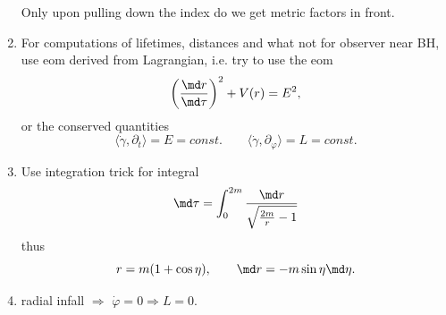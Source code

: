 \begin{enumerate}
\begin{equation}
\end{equation}
Only upon pulling down the index do we get metric factors in front.
\item For computations of lifetimes, distances and what not for observer near BH, use eom derived from Lagrangian, i.e. try to use the eom
\begin{equation}
	\left(\frac{\md r}{\md \tau}\right)^2 + V(r) = E^2,
\end{equation}
or the conserved quantities 
\begin{equation}
	\langle \dot{\gamma} , \partial_t\rangle = E= const. \qquad \langle \dot{\gamma},\partial_\varphi\rangle = L =const.
	\end{equation}

\item Use integration trick for integral
\begin{equation}
	\md \tau = \int_0^{2m} \frac{\md r}{\sqrt{\frac{2m}{r} -1}}
\end{equation}
thus
\begin{equation}
	r = m(1+\cos \eta),\qquad \md r = - m \sin \eta \md \eta.
\end{equation}
\item radial infall $\Rightarrow$ $\dot{\varphi}=0 \Rightarrow L=0$.
\end{enumerate}